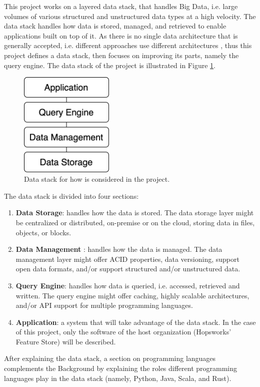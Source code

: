 This project works on a layered data stack, that handles Big Data, i.e. large volumes of various structured and unstructured data types at a high velocity. The data stack handles how data is stored, managed, and retrieved to enable applications built on top of it. 
As there is no single data architecture that is generally accepted, i.e. different approaches use different architectures \cite{framptonCompleteGuideOpen2018,sakrBigDataProcessing2017}, thus this project defines a data stack, then focuses on improving its parts, namely the query engine. The data stack of the project is illustrated in Figure \ref{fig:data_stack}.

\begin{figure}[!ht]
    \begin{center}
      \includegraphics[width=0.4\textwidth]{figures/2-background/data_stack.png}
    \end{center}
    \caption{Data stack for how is considered in the project.}
    \label{fig:data_stack}
\end{figure}

The data stack is divided into four sections:
\begin{enumerate}
    \item \textbf{Data Storage}: handles how the data is stored. The data storage layer might be centralized or distributed, on-premise or on the cloud, storing data in files, objects, or blocks.
    \item \textbf{Data Management} : handles how the data is managed. The data management layer might offer \gls{ACID} properties, data versioning, support open data formats, and/or support structured and/or unstructured data.
    \item \textbf{Query Engine}: handles how data is queried, i.e. accessed, retrieved and written. The query engine might offer caching, highly scalable architectures, and/or \gls{API} support for multiple programming languages.
    \item \textbf{Application}: a system that will take advantage of the data stack. In the case of this project, only the software of the host organization (Hopsworks' Feature Store) will be described. 
\end{enumerate}

After explaining the data stack, a section on programming languages complements the Background by explaining the roles different programming languages play in the data stack (namely, Python, Java, Scala, and Rust).
